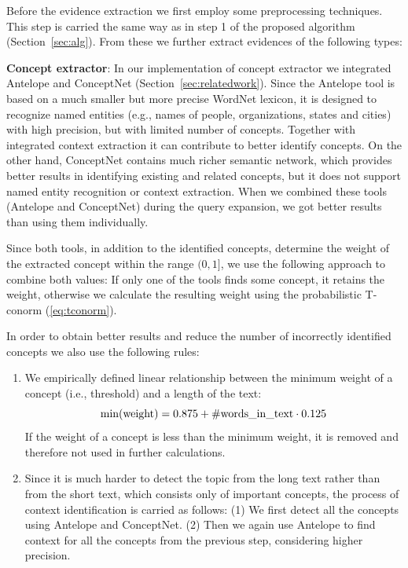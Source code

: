 \documentclass[conference]{IEEEtran}
\newcommand{\secref}[1]{Section~\ref{#1}}
\begin{document}
Before the evidence extraction we first employ some preprocessing techniques. This step is carried the same way as in step 1 of the proposed algorithm (\secref{sec:alg}). From these we further extract evidences of the following types:

{\bf Concept extractor}:
In our implementation of concept extractor we integrated Antelope and ConceptNet (\secref{sec:relatedwork}). Since the Antelope tool is based on a much smaller but more precise WordNet lexicon, it is designed to recognize named entities (e.g., names of people, organizations, states and cities) with high precision, but with limited number of concepts. Together with integrated context extraction it can contribute to better identify concepts. On the other hand, ConceptNet contains much richer semantic network, which provides better results in identifying existing and related concepts, but it does not support named entity recognition or context extraction. When we combined these tools (Antelope and ConceptNet) during the query expansion, we got better results than using them individually.

Since both tools, in addition to the identified concepts, determine the weight of the extracted concept within the range $(0,1]$, we use the following approach to combine both values: If only one of the tools finds some concept, it retains the weight, otherwise we calculate the resulting weight using the probabilistic T-conorm (\ref{eq:tconorm}). 

In order to obtain better results and reduce the number of incorrectly identified concepts we also use the following rules:
\begin{enumerate}
	\item We empirically defined linear relationship between the minimum weight of a concept (i.e., threshold) and a length of the text:
$$
	{\rm min(weight)} = 0.875 + {\rm \#words\_in\_text} \cdot 0.125
$$
If the weight of a concept is less than the minimum weight, it is removed and therefore not used in further calculations.
	\item Since it is much harder to detect the topic from the long text rather than from the short text, which consists only of important concepts, the process of context identification is carried as follows: (1) We first detect all the concepts using Antelope and ConceptNet. (2) Then we again use Antelope to find context for all the concepts from the previous step, considering higher precision.
\end{enumerate}
\end{document}
